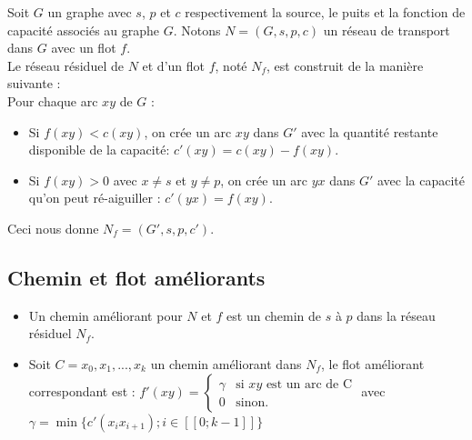 \documentclass[a4paper]{article}
\begin{document}
Soit $G$ un graphe avec $s$, $p$ et $c$ respectivement la source, le puits et la fonction de capacité associés au graphe $G$. Notons $N = (G,s,p,c)$ un réseau de transport dans $G$ avec un flot $f$.\\
Le réseau résiduel de $N$ et d'un flot $f$, noté $N_f$, est construit de la manière suivante :\\
Pour chaque arc $xy$ de $G$ :
\begin{itemize}
	\item
    Si $f(xy)<c(xy)$, on crée un arc $xy$ dans $G'$ avec la quantité restante disponible de la capacité: $c'(xy) = c(xy) - f(xy)$.
    \item 
    Si $f(xy)>0$ avec $x\ne s$ et $y\ne p$, on crée un arc $yx$ dans $G'$ avec la capacité qu'on peut ré-aiguiller : $c'(yx) = f(xy)$.
\end{itemize}
Ceci nous donne $N_f = (G',s,p,c')$.\\
\subsection{Chemin et flot améliorants}
\begin{itemize}
	\item
    Un chemin améliorant pour $N$ et $f$ est un chemin de $s$ à $p$ dans la réseau résiduel $N_f$.
    \item
    Soit $C = x_0,x_1,...,x_k$ un chemin améliorant dans $N_f$, le flot améliorant correspondant est :
$f'(xy) = \left\{
    \begin{array}{ll}
        \gamma & \mbox{si } xy \mbox{ est un arc de C} \\
        0 & \mbox{sinon.}
    \end{array}
\right.$
avec $\gamma = \min \{c'(x_ix_{i+1}); i \in [\![0;k-1]\!]\}$\\
\end{itemize}
\end{document}
